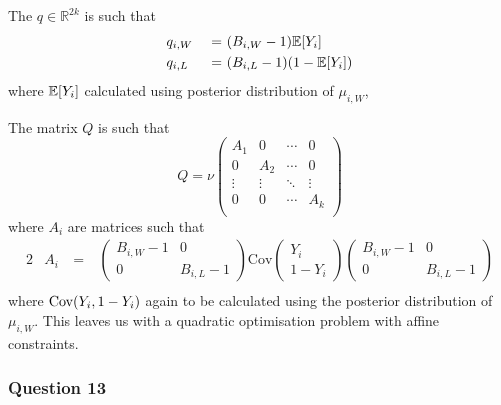 \documentclass[11pt]{article} %
\let\originalleft\left
\let\originalright\right
\renewcommand{\left}{\mathopen{}\mathclose\bgroup\originalleft}
\renewcommand{\right}{\aftergroup\egroup\originalright}
\begin{document}
The $q \in \mathbb{R}^{2k}$ is such that
\begin{alignat*}{2}
& q_{i, W} &\ =\ & \left(B_{i, W}-1\right)\mathbb{E}\left[Y_i\right] \\
& q_{i, L} &\ =\ & \left(B_{i, L}-1\right)\left(1-\mathbb{E}\left[Y_i\right]\right)
\end{alignat*}
where $\mathbb{E}\left[Y_i\right]$ calculated using posterior distribution of $\mu_{i,W}$,

The matrix $Q$ is such that
\begin{equation*}
	Q = \nu
	\begin{pmatrix}
		A_1 & 0 & \cdots & 0\\
		0 & A_2 & \cdots & 0\\
		\vdots & \vdots & \ddots & \vdots \\
		0 & 0 & \cdots & A_k \\
	\end{pmatrix}
\end{equation*}
where $A_i$ are matrices such that
\begin{alignat*}{2}
	& A_i &\ =\ &
	\begin{pmatrix}
	B_{i, W}-1 & 0\\
	0 & B_{i, L}-1
	\end{pmatrix}
	\text{Cov}
	\begin{pmatrix}
		Y_{i} \\
		1-Y_{i}
	\end{pmatrix}
	\begin{pmatrix}
	B_{i, W}-1 & 0\\
	0 & B_{i, L}-1
	\end{pmatrix} \\
\end{alignat*}
where $\text{Cov}\left(Y_{i}, 1-Y_{i}\right)$ again to be calculated using the posterior distribution of $\mu_{i,W}$. This leaves us with a quadratic optimisation problem with affine constraints.

\subsubsection*{Question 13}
\end{document}
